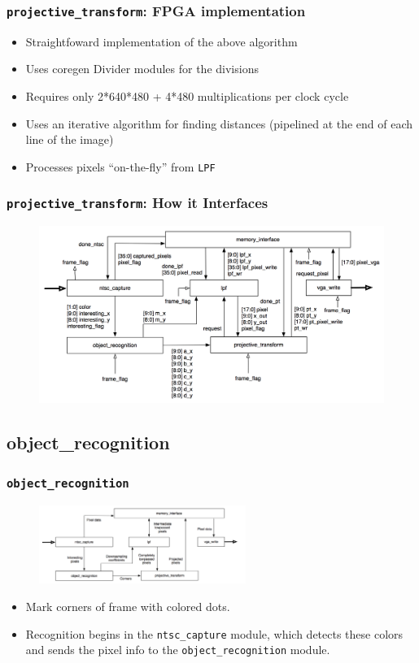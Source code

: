 \documentclass{beamer}
\begin{document}
\begin{frame}
	\frametitle{{\tt projective\_transform}: FPGA implementation}
	\begin{itemize}
	\item Straightfoward implementation of the above algorithm
	\item Uses coregen Divider modules for the divisions
	\item Requires only 2*640*480 + 4*480 multiplications per clock cycle
	\item Uses an iterative algorithm for finding distances (pipelined at the end of each line of the image)
	\item Processes pixels ``on-the-fly'' from {\tt LPF}
	\end{itemize}
\end{frame}


\begin{frame}
	\frametitle{{\tt projective\_transform}: How it Interfaces}
	\begin{figure}
		\centering
		\includegraphics[width=\textwidth]{../proposal/block_diagram_with_wires.png}
	\end{figure}
\end{frame}

\subsection{object\_recognition}


\begin{frame}
	\frametitle{{\tt object\_recognition}}

	\begin{figure}
		\centering
		\includegraphics[width=0.6\textwidth]{../proposal/simplified_block_diagram.png}
	\end{figure}
	
		\begin{itemize}
		\item Mark corners of frame with colored dots.
		\item Recognition begins in the {\tt ntsc\_capture} module, which detects these colors and sends the pixel info to the {\tt object\_recognition} module.
	\end{itemize}
\end{frame}
\end{document}

